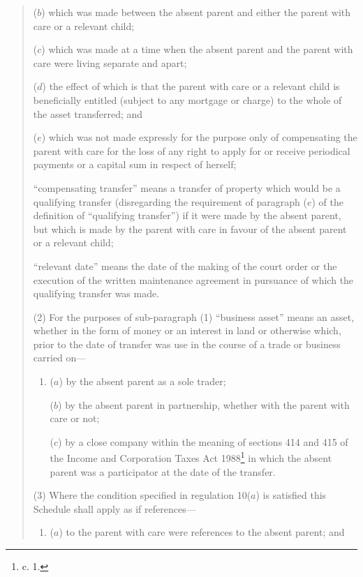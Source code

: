 \documentclass[12pt,a4paper]{article}
\begin{document}
\begin{quotation}
\begin{enumerate}
\begin{enumerate}
($b$) which was made between the absent parent and either the parent with care or a relevant child;

($c$) which was made at a time when the absent parent and the parent with care were living separate and apart;

($d$) the effect of which is that the parent with care or a relevant child is beneficially entitled (subject to any mortgage or charge) to the whole of the asset transferred; and 

($e$) which was not made expressly for the purpose only of compensating the parent with care for the loss of any right to apply for or receive periodical payments or a capital sum in respect of herself;
\end{enumerate}

“compensating transfer” means a transfer of property which would be a qualifying transfer (disregarding the requirement of paragraph ($e$) of the definition of “qualifying transfer”) if it were made by the absent parent, but which is made by the parent with care in favour of the absent parent or a relevant child;

“relevant date” means the date of the making of the court order or the execution of the written maintenance agreement in pursuance of which the qualifying transfer was made.
\end{enumerate}

(2) For the purposes of sub-paragraph (1) “business asset” means an asset, whether in the form of money or an interest in land or otherwise which, prior to the date of transfer was use in the course of a trade or business carried on—
\begin{enumerate}\item[]
($a$) by the absent parent as a sole trader;

($b$) by the absent parent in partnership, whether with the parent with care or not;

($c$) by a close company within the meaning of sections 414 and 415 of the Income and Corporation Taxes Act 1988\footnote{ c. 1.} in which the absent parent was a participator at the date of the transfer.
\end{enumerate}

(3) Where the condition specified in regulation 10($a$) is satisfied this Schedule shall apply as if references—
\begin{enumerate}\item[]
($a$) to the parent with care were references to the absent parent; and


\end{enumerate}
\end{quotation}
\end{document}
